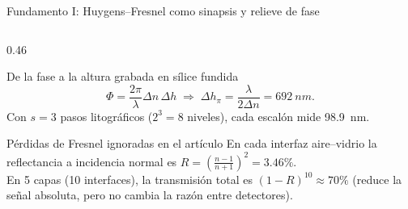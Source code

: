 \documentclass[aspectratio=169,10pt]{beamer}
\begin{document}
\begin{frame}{Fundamento I: Huygens--Fresnel como sinapsis y relieve de fase}
\begin{columns}[T,onlytextwidth]
\begin{column}{0.46\textwidth}
\begin{caja}{De la fase a la altura grabada en sílice fundida}
      \[
        \Phi=\frac{2\pi}{\lambda}\Delta n\,\Delta h
        \;\Longrightarrow\;
        \Delta h_\pi=\frac{\lambda}{2\Delta n}=\SI{692}{nm}.
      \]
      Con $s=3$ pasos litográficos ($2^3=8$ niveles), cada escalón mide \SI{98.9}{nm}.
    \end{caja}
    \vspace{5pt}
    \begin{azulbox}{Pérdidas de Fresnel ignoradas en el artículo}
      \scriptsize
      En cada interfaz aire--vidrio la reflectancia a incidencia normal es
      $R=\left(\frac{n-1}{n+1}\right)^2=3.46\%$.\\[3pt]
      En 5 capas (10 interfaces), la transmisión total es $(1-R)^{10}\approx 70\%$ (reduce la señal absoluta, pero no cambia la razón entre detectores).
    \end{azulbox}
  \end{column}
\end{columns}
\end{frame}
\end{document}
